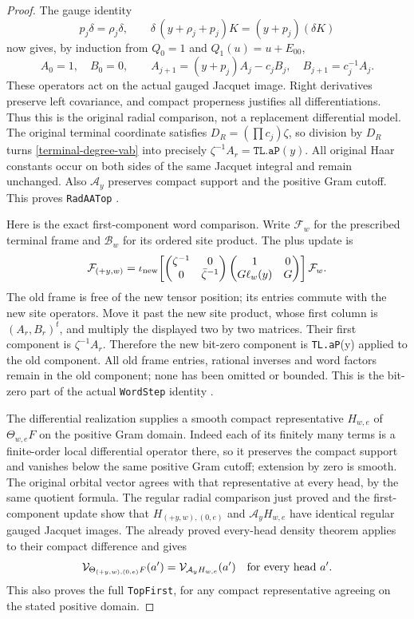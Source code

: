 \begin{proof}
The gauge identity
\[
       p_j\delta=\rho_j\delta,\qquad
       \delta\,(y+\rho_j+p_j)K=(y+p_j)(\delta K)
\]
now gives, by induction from $Q_0=1$ and $Q_1(u)=u+E_{00}$,
\begin{equation}\label{terminal-degree-vab}
 A_0=1,\quad B_0=0,\qquad
 A_{j+1}=(y+p_j)A_j-c_jB_j,\quad B_{j+1}=c_j^{-1}A_j.
\end{equation}
These operators act on the actual gauged Jacquet image.
Right derivatives preserve left covariance,
and compact properness justifies all differentiations.  Thus this
is the original radial comparison, not a replacement differential
model.  The original terminal coordinate satisfies
$D_R=(\prod c_j)\zeta$, so division by $D_R$ turns
\eqref{terminal-degree-vab} into precisely
$\zeta^{-1}A_r=\texttt{TL.aP}(y)$.  All original Haar constants
occur on both sides of the same Jacquet integral and remain
unchanged.  Also $\mathcal A_y$ preserves compact support and
the positive Gram cutoff.  This proves \texttt{RadAATop}
\cite{terminal-degree-radial-source}.

Here is the exact first-component word comparison.  Write
$\mathcal F_w$ for the prescribed terminal frame and
$\mathcal B_w$ for its ordered site product.  The plus update is
\[
 \mathcal F_{(+y,w)}=
 \iota_{\rm new}\!\left[
 \begin{pmatrix}\zeta^{-1}&0\\0&\bar\zeta^{-1}\end{pmatrix}
 \begin{pmatrix}1&0\\G\ell_w(y)&G\end{pmatrix}\right]
 \mathcal F_w.
\]
The old frame is free of the new tensor position; its entries
commute with the new site operators.  Move it past the new site
product, whose first column is $(A_r,B_r)^t$, and multiply the
displayed two by two matrices.  Their first component is
$\zeta^{-1}A_r$.  Therefore the new bit-zero component is
\texttt{TL.aP}(y) applied to the old component.  All old frame
entries, rational inverses and word factors remain in the old
component; none has been omitted or bounded.  This is the
bit-zero part of the actual \texttt{WordStep} identity
\cite{terminal-degree-word-source}.

The differential realization supplies a smooth compact
representative $H_{w,e}$ of $\Theta_{w,e}F$ on the positive
Gram domain.  Indeed each of its finitely many terms is a
finite-order local differential operator there, so it preserves
the compact support and vanishes below the same positive Gram
cutoff; extension by zero is smooth.  The original orbital
vector agrees with that representative at every head, by the
same quotient formula.  The regular radial comparison just
proved and the first-component update show that
$H_{(+y,w),(0,e)}$ and $\mathcal A_yH_{w,e}$ have identical
regular gauged Jacquet images.  The already proved every-head
density theorem applies to their compact difference and gives
\[
     \mathcal V_{\Theta_{(+y,w),(0,e)}F}(a')
                       =\mathcal V_{\mathcal A_yH_{w,e}}(a')
                                   \quad\hbox{for every head }a'.
\]
This also proves the full \texttt{TopFirst}, for any compact
representative agreeing on the stated positive domain.


\end{proof}
